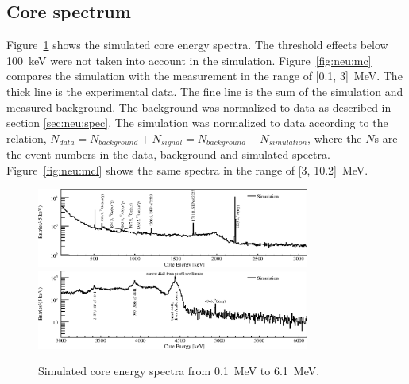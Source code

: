 \subsection{Core spectrum}
\label{sec:neu:spemc}
Figure~\ref{fig:neu:mca} shows the simulated core energy spectra. The threshold effects below 100~keV were not taken into account in the simulation. Figure~\ref{fig:neu:mc} compares the simulation with the measurement in the range of [0.1, 3]~MeV. The thick line is the experimental data. The fine line is the sum of the simulation and measured background. The background was normalized to data as described in section \ref{sec:neu:spec}. The simulation was normalized to data according to the relation, $N_{data} = N_{background} + N_{signal} = N_{background} + N_{simulation}$, where the $N$s are the event numbers in the data, background and simulated spectra. Figure~\ref{fig:neu:mcl} shows the same spectra in the range of [3, 10.2]~MeV.

\begin{figure}[tbhp]
  \centering
  \includegraphics[width=0.8\textwidth,clip]{spectra_mc1}
  \includegraphics[width=0.8\textwidth,clip]{spectra_mc2}
  \caption{Simulated core energy spectra from 0.1~MeV to 6.1~MeV.}
  \label{fig:neu:mca}
\end{figure}

